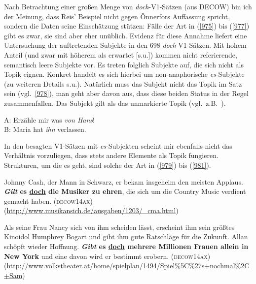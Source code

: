 {Nach Betrachtung einer großen Menge von \textit{doch}-V1-Sätzen (aus DECOW) bin ich der Meinung, dass Reis' Beispiel nicht gegen Önnerfors Auffassung spricht, sondern die Daten seine Einschätzung stützen: Fälle der Art in (\ref{975}) bis (\ref{977}) gibt es zwar, sie sind aber eher unüblich. Evidenz für diese Annahme liefert eine Untersuchung der auftretenden Subjekte in den 698 \textit{doch}-V1-Sätzen. Mit hohem Anteil (und zwar mit höherem als erwartet [s.u.]) kommen nicht referierende, semantisch leere Subjekte vor. Es treten folglich Subjekte auf, die sich nicht als Topik  eignen. Konkret handelt es sich hierbei um non-anaphorische \textit{es}-Subjekte (zu weiteren Details s.u.). Natürlich muss das Subjekt nicht das Topik im Satz sein (vgl.\ \ref{978}), man geht aber davon aus, dass diese beiden Status in der Regel zusammenfallen. Das Subjekt gilt als das unmarkierte Topik (vgl.\ z.B.\ \citealt[132]{Lambrecht1994}).\largerpage[2]

\begin{exe}
	\ex\label{978}
	A: Erzähle mir was \textit{von Hans}!\\
	B: Maria hat \textit{ihn} verlassen.
\end{exe}
In den besagten V1-Sätzen mit \textit{es}-Subjekten scheint mir ebenfalls nicht das Verhältnis vorzuliegen, dass stets andere Elemente als Topik fungieren. Strukturen, um die es geht, sind solche der Art in (\ref{979}) bis (\ref{981}).

\begin{exe}
	\ex\label{979}

	Johnny Cash, der Mann in Schwarz, er bekam insgeheim den meisten Applaus. \textbf{\textit{Gilt} es \ul{doch} die Musiker zu ehren}, die sich um 		die Country Music verdient gemacht haben.
	\hfill\hbox{\scshape(decow14ax)}
	\newline
	{\scriptsize(\url{http://www.musikansich.de/ausgaben/1203/\_cma.html})}
\end{exe}


\begin{exe}
	\ex\label{980}

	Als seine Frau Nancy sich von ihm scheiden lässt, erscheint ihm sein größtes Kinoidol Humphrey Bogart und gibt ihm gute Ratschläge für die Zukunft. 		Allan schöpft wieder Hoffnung. \textbf{\textit{Gibt} es \ul{doch} mehrere Millionen Frauen allein in New York} und eine davon wird er bestimmt 		erobern. 
	\newline
	\hbox{}\hfill\hbox{\scshape(decow14ax)}
	\newline
	{\scriptsize(\url{http://www.volkstheater.at/home/spielplan/1494/Spiel\%5C\%27s+nochmal\%2C+Sam})}
\end{exe}							          
		   
}
